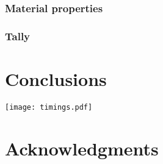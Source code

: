\documentclass{mc2015}
\begin{document}
\subsubsection{Material properties}



\subsubsection{Tally}



\section{Conclusions}

\texttt{[image: timings.pdf]}

\section{Acknowledgments}



\setlength{\baselineskip}{12pt}




\appendix
\section{}
\end{document}

